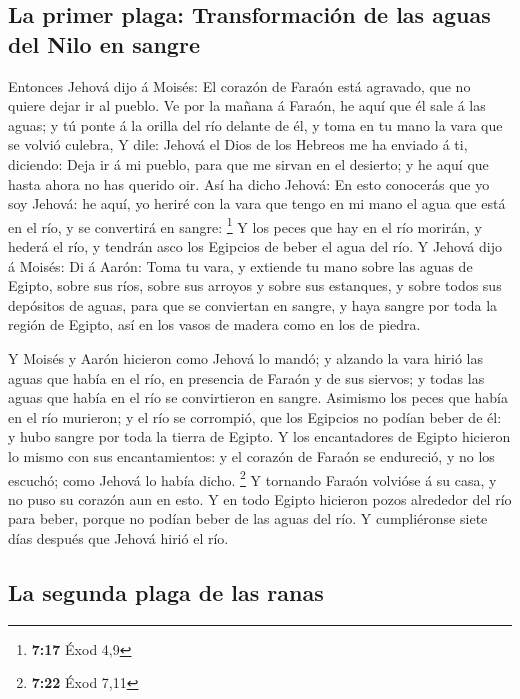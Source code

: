 \hypertarget{la-primer-plaga-transformaciuxf3n-de-las-aguas-del-nilo-en-sangre}{%
\subsection{La primer plaga: Transformación de las aguas del Nilo en
sangre}\label{la-primer-plaga-transformaciuxf3n-de-las-aguas-del-nilo-en-sangre}}

 Entonces Jehová dijo á Moisés: El corazón de Faraón está
agravado, que no quiere dejar ir al pueblo.  Ve por la
mañana á Faraón, he aquí que él sale á las aguas; y tú ponte á la orilla
del río delante de él, y toma en tu mano la vara que se volvió culebra,
 Y dile: Jehová el Dios de los Hebreos me ha enviado á
ti, diciendo: Deja ir á mi pueblo, para que me sirvan en el desierto; y
he aquí que hasta ahora no has querido oir.  Así ha dicho
Jehová: En esto conocerás que yo soy Jehová: he aquí, yo heriré con la
vara que tengo en mi mano el agua que está en el río, y se convertirá en
sangre: \footnote{\textbf{7:17} Éxod 4,9}  Y los peces
que hay en el río morirán, y hederá el río, y tendrán asco los Egipcios
de beber el agua del río.  Y Jehová dijo á Moisés: Di á
Aarón: Toma tu vara, y extiende tu mano sobre las aguas de Egipto, sobre
sus ríos, sobre sus arroyos y sobre sus estanques, y sobre todos sus
depósitos de aguas, para que se conviertan en sangre, y haya sangre por
toda la región de Egipto, así en los vasos de madera como en los de
piedra.

 Y Moisés y Aarón hicieron como Jehová lo mandó; y
alzando la vara hirió las aguas que había en el río, en presencia de
Faraón y de sus siervos; y todas las aguas que había en el río se
convirtieron en sangre.  Asimismo los peces que había en
el río murieron; y el río se corrompió, que los Egipcios no podían beber
de él: y hubo sangre por toda la tierra de Egipto.  Y los
encantadores de Egipto hicieron lo mismo con sus encantamientos: y el
corazón de Faraón se endureció, y no los escuchó; como Jehová lo había
dicho. \footnote{\textbf{7:22} Éxod 7,11}  Y tornando
Faraón volvióse á su casa, y no puso su corazón aun en esto.
 Y en todo Egipto hicieron pozos alrededor del río para
beber, porque no podían beber de las aguas del río.  Y
cumpliéronse siete días después que Jehová hirió el río.

\hypertarget{la-segunda-plaga-de-las-ranas}{%
\subsection{La segunda plaga de las
ranas}\label{la-segunda-plaga-de-las-ranas}}

